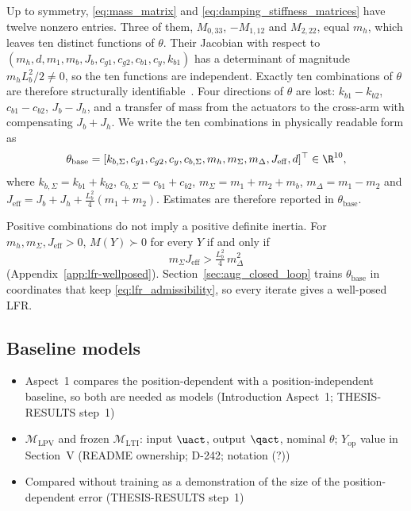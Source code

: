 Up to symmetry, \eqref{eq:mass_matrix} and \eqref{eq:damping_stiffness_matrices}
have twelve nonzero entries.
Three of them, $M_{0,33}$, $-M_{1,12}$ and $M_{2,22}$, equal $m_h$, which
leaves ten distinct functions of $\theta$.
Their Jacobian with respect to
$(m_h,d,m_1,m_b,J_b,c_{g1},c_{g2},c_{b1},c_y,k_{b1})$ has a determinant of
magnitude $m_hL_b^2/2\neq0$, so the ten functions are independent.
Exactly ten combinations of $\theta$ are therefore structurally
identifiable~\cite[Def.~7]{ovchinnikov2021computing}.
Four directions of $\theta$ are lost: $k_{b1}-k_{b2}$, $c_{b1}-c_{b2}$,
$J_b-J_h$, and a transfer of mass from the actuators to the cross-arm with
compensating $J_b+J_h$.
We write the ten combinations in physically readable form as
\begin{equation}
  \theta_{\mathrm{base}}=[k_{b,\Sigma},c_{g1},c_{g2},c_y,c_{b,\Sigma},
  m_h,m_\Sigma,m_\Delta,J_{\mathrm{eff}},d]^\top\in\R^{10},
  \label{eq:phi}
\end{equation}
where $k_{b,\Sigma}=k_{b1}+k_{b2}$, $c_{b,\Sigma}=c_{b1}+c_{b2}$,
$m_\Sigma=m_1+m_2+m_b$, $m_\Delta=m_1-m_2$ and
$J_{\mathrm{eff}}=J_b+J_h+\tfrac{L_b^2}{4}(m_1+m_2)$.
Estimates are therefore reported in $\theta_{\mathrm{base}}$.

Positive combinations do not imply a positive definite inertia.
For $m_h,m_\Sigma,J_{\mathrm{eff}}>0$, $M(Y)\succ0$ for every $Y$ if and
only if
\begin{equation}
  m_\Sigma J_{\mathrm{eff}}>\tfrac{L_b^2}{4}\,m_\Delta^2
  \label{eq:lfr_admissibility}
\end{equation}
(Appendix~\ref{app:lfr-wellposed}).
Section~\ref{sec:aug_closed_loop} trains $\theta_{\mathrm{base}}$ in
coordinates that keep \eqref{eq:lfr_admissibility}, so every iterate gives a
well-posed LFR.

\subsection{Baseline models}\label{sec:baseline_models}
\ifdraft
\begin{itemize}
\item Aspect~1 compares the position-dependent with a position-independent baseline, so both are needed as models (Introduction Aspect~1; THESIS-RESULTS step~1)
\item $\mathcal M_{\mathrm{LPV}}$ and frozen $\mathcal M_{\mathrm{LTI}}$: input $\uact$, output $\qact$, nominal $\theta$; $Y_{\mathrm{op}}$ value in Section~V (README ownership; D-242; notation (?))
\item Compared without training as a demonstration of the size of the position-dependent error (THESIS-RESULTS step~1)
\end{itemize}
\fi

